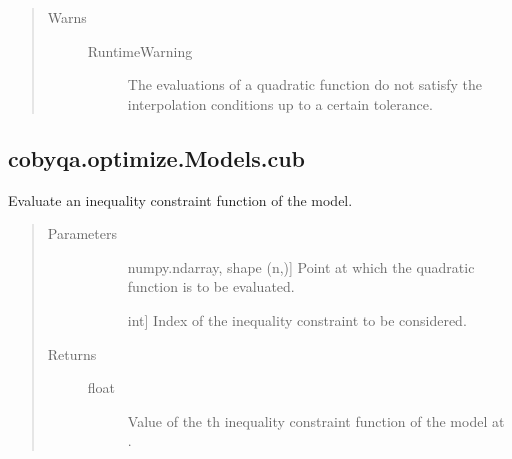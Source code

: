 \documentclass[letterpaper,10pt,english]{sphinxmanual}
\begin{document}
\begin{fulllineitems}
\begin{fulllineitems}
\begin{quote}
\begin{description}
\begin{description}
\end{description}

\item[{Warns}] \leavevmode\begin{description}
\item[{RuntimeWarning}] \leavevmode
\sphinxAtStartPar
The evaluations of a quadratic function do not satisfy the
interpolation conditions up to a certain tolerance.

\end{description}

\end{description}\end{quote}

\end{fulllineitems}



\subsection{cobyqa.optimize.Models.cub}
\label{\detokenize{refs/generated/cobyqa.optimize.Models.cub:cobyqa-optimize-models-cub}}\label{\detokenize{refs/generated/cobyqa.optimize.Models.cub::doc}}

\begin{fulllineitems}
\label{\detokenize{refs/generated/cobyqa.optimize.Models.cub:cobyqa.optimize.Models.cub}}
\sphinxAtStartPar
Evaluate an inequality constraint function of the model.
\begin{quote}\begin{description}
\item[{Parameters}] \leavevmode\begin{description}
\item[{}] \leavevmode{[}numpy.ndarray, shape (n,){]}
\sphinxAtStartPar
Point at which the quadratic function is to be evaluated.

\item[{}] \leavevmode{[}int{]}
\sphinxAtStartPar
Index of the inequality constraint to be considered.

\end{description}

\item[{Returns}] \leavevmode\begin{description}
\item[{float}] \leavevmode
\sphinxAtStartPar
Value of the \sphinxhyphen{}th inequality constraint function of the model at
.


\end{description}
\end{description}
\end{quote}
\end{fulllineitems}
\end{fulllineitems}
\end{document}

